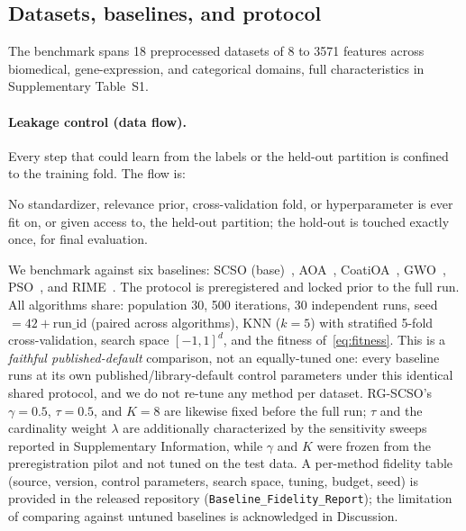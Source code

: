 \documentclass[iicol,sn-basic,pdflatex]{sn-jnl}
\begin{document}
\subsection{Datasets, baselines, and protocol}
The benchmark spans 18 preprocessed datasets of 8 to
3571 features across biomedical, gene-expression, and categorical
domains, full characteristics in Supplementary Table~S1.

\paragraph{Leakage control (data flow).} Every step that could learn from
the labels or the held-out partition is confined to the training fold. The
flow is:
\begin{center}
\footnotesize
{}
\end{center}
No standardizer, relevance prior, cross-validation fold, or hyperparameter is
ever fit on, or given access to, the held-out partition; the hold-out is
touched exactly once, for final evaluation.

We benchmark against six baselines: SCSO (base)~\cite{scso},
AOA~\cite{aoa}, CoatiOA~\cite{coa}, GWO~\cite{gwo}, PSO~\cite{pso}, and
RIME~\cite{rime}. The protocol is preregistered and locked prior to the full
run. All algorithms share: population 30, 500 iterations, 30 independent
runs, seed $=42+\mathrm{run\_id}$ (paired across algorithms), KNN ($k=5$)
with stratified 5-fold cross-validation, search space $[-1,1]^d$, and the
fitness of~\eqref{eq:fitness}. This is a \emph{faithful published-default}
comparison, not an equally-tuned one: every baseline runs at its own
published/library-default control parameters under this identical shared
protocol, and we do not re-tune any method per dataset. RG-SCSO's
$\gamma=0.5$, $\tau=0.5$, and $K=8$ are likewise fixed before the full run;
$\tau$ and the cardinality weight $\lambda$ are additionally characterized by
the sensitivity sweeps reported in Supplementary Information, while $\gamma$
and $K$ were frozen from the preregistration pilot and not tuned on the test
data. A per-method fidelity table (source, version, control parameters, search
space, tuning, budget, seed) is provided in the released repository
(\texttt{Baseline\_Fidelity\_Report}); the limitation of comparing against
untuned baselines is acknowledged in Discussion.
\end{document}

